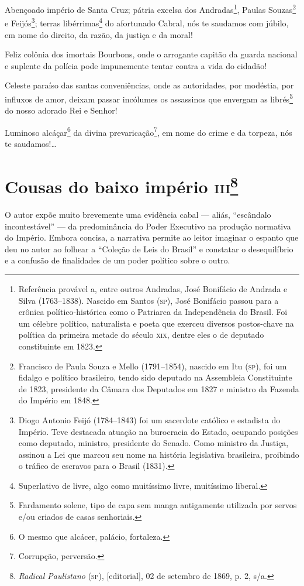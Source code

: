 Abençoado império de Santa Cruz; pátria excelsa dos Andradas\footnote{
  Referência provável a, entre outros Andradas, José Bonifácio de
  Andrada e Silva (1763--1838). Nascido em Santos (\textsc{sp}), José Bonifácio
  passou para a crônica político-histórica como o Patriarca da
  Independência do Brasil. Foi um célebre político, naturalista e poeta
  que exerceu diversos postos-chave na política da primeira metade do
  século \textsc{xix}, dentre eles o de deputado constituinte em 1823.}, Paulas
Souzas\footnote{Francisco de Paula Souza e Mello (1791--1854), nascido
  em Itu (\textsc{sp}), foi um fidalgo e político brasileiro, tendo sido deputado
  na Assembleia Constituinte de 1823, presidente da Câmara dos Deputados
  em 1827 e ministro da Fazenda do Império em 1848.} e
Feijós\footnote{Diogo Antonio Feijó (1784--1843) foi um sacerdote
  católico e estadista do Império. Teve destacada atuação na burocracia
  do Estado, ocupando posições como deputado, ministro, presidente do
  Senado. Como ministro da Justiça, assinou a Lei que marcou seu nome na
  história legislativa brasileira, proibindo o tráfico de escravos para
  o Brasil (1831).}; terras libérrimas\footnote{Superlativo de livre,
  algo como muitíssimo livre, muitíssimo liberal.} do afortunado Cabral,
nós te saudamos com júbilo, em nome do direito, da razão, da justiça e
da moral!

Feliz colônia dos imortais Bourbons, onde o arrogante capitão da guarda
nacional e suplente da polícia pode impunemente tentar contra a vida do
cidadão!

Celeste paraíso das santas conveniências, onde as autoridades, por
modéstia, por influxos de amor, deixam passar incólumes os assassinos
que envergam as librés\footnote{Fardamento solene, tipo de capa sem
  manga antigamente utilizada por servos e/ou criados de casas
  senhoriais.} do nosso adorado Rei e Senhor!

Luminoso alcáçar\footnote{O mesmo que alcácer, palácio, fortaleza.} da
divina prevaricação\footnote{Corrupção, perversão.}, em nome do crime
e da torpeza, nós te saudamos!\ldots{}

\chapter{Cousas do baixo império \textsc{iii}\footnote{\emph{Radical
  Paulistano} (\textsc{sp}), {[}editorial{]}, 02 de setembro de 1869, p. 2, s/a.}}

\begin{didascalia}
O autor expõe muito brevemente uma evidência cabal --- aliás, ``escândalo
incontestável'' --- da predominância do Poder Executivo na produção
normativa do Império. Embora concisa, a narrativa permite ao leitor
imaginar o espanto que deu no autor ao folhear a ``Coleção de Leis do
Brasil'' e constatar o desequilíbrio e a confusão de finalidades de um
poder político sobre o outro.
\end{didascalia}



